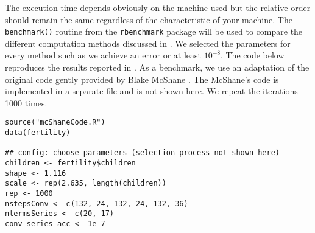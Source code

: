 \documentclass[a4paper,twoside,11pt]{article}
\begin{document}
The execution time depends obviously on the machine used but the relative order
should remain the same regardless of the characteristic of your machine. The
\texttt{benchmark()} routine from the \texttt{rbenchmark} package \citet{rbench2012} will be
used to compare the different computation methods discussed in
\citet{baker2017event}. We selected the parameters for every method such as we
achieve an error or at least \(10^{-8}\). The code below reproduces the results
reported in \citet[Table 2]{baker2017event}. As a benchmark, we use an
adaptation of the original code gently provided by Blake McShane 
\citep{mcshane2008count}. The McShane's code is implemented in a separate file
and is not shown here. We repeat the iterations 1000 times.
\begin{verbatim}
source("mcShaneCode.R")
data(fertility)

## config: choose parameters (selection process not shown here)
children <- fertility$children
shape <- 1.116
scale <- rep(2.635, length(children))
rep <- 1000
nstepsConv <- c(132, 24, 132, 24, 132, 36)
ntermsSeries <- c(20, 17)
conv_series_acc <- 1e-7


\end{verbatim}
\end{document}
